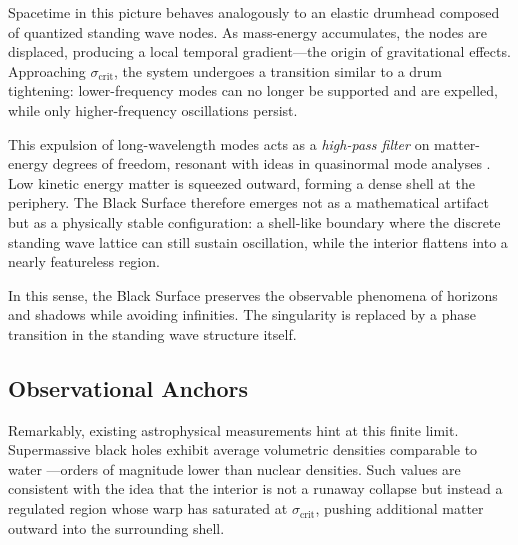 \documentclass[12pt]{article}
\begin{document}
Spacetime in this picture behaves analogously to an elastic drumhead composed of quantized standing wave nodes. As mass-energy accumulates, the nodes are displaced, producing a local temporal gradient---the origin of gravitational effects. Approaching $\sigma_{\text{crit}}$, the system undergoes a transition similar to a drum tightening: lower-frequency modes can no longer be supported and are expelled, while only higher-frequency oscillations persist.

This expulsion of long-wavelength modes acts as a \emph{high-pass filter} on matter-energy degrees of freedom, resonant with ideas in quasinormal mode analyses \cite{kokkotas1999}. Low kinetic energy matter is squeezed outward, forming a dense shell at the periphery. The Black Surface therefore emerges not as a mathematical artifact but as a physically stable configuration: a shell-like boundary where the discrete standing wave lattice can still sustain oscillation, while the interior flattens into a nearly featureless region.

In this sense, the Black Surface preserves the observable phenomena of horizons and shadows while avoiding infinities. The singularity is replaced by a phase transition in the standing wave structure itself.

\subsection{Observational Anchors}

Remarkably, existing astrophysical measurements hint at this finite limit. Supermassive black holes exhibit average volumetric densities comparable to water \cite{king2006, ozel2010}---orders of magnitude lower than nuclear densities. Such values are consistent with the idea that the interior is not a runaway collapse but instead a regulated region whose warp has saturated at $\sigma_{\text{crit}}$, pushing additional matter outward into the surrounding shell.
\end{document}
